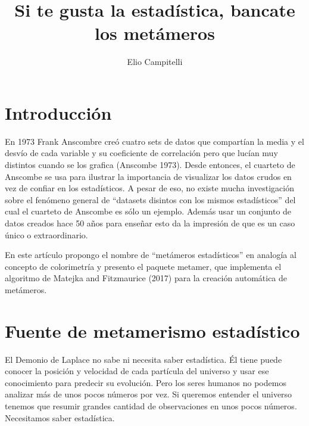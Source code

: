 \documentclass[runningheads,español]{llncs}
\begin{document}
%
\title{Si te gusta la estadística, bancate los metámeros}
%
%
\author{
Elio Campitelli }



%
\maketitle
%

 



\hypertarget{introduccion}{%
\section{Introducción}\label{introduccion}}

En 1973 Frank Anscombre creó cuatro sets de datos que compartían la
media y el desvío de cada variable y su coeficiente de correlación pero
que lucían muy distintos cuando se los grafica (Anscombe 1973). Desde
entonces, el cuarteto de Anscombe se usa para ilustrar la importancia de
visualizar los datos crudos en vez de confiar en los estadísticos. A
pesar de eso, no existe mucha investigación sobre el fenómeno general de
``datasets disintos con los mismos estadísticos'' del cual el cuarteto
de Anscombe es sólo un ejemplo. Además usar un conjunto de datos creados
hace 50 años para enseñar esto da la impresión de que es un caso único o
extraordinario.

En este artículo propongo el nombre de ``metámeros estadísticos'' en
analogía al concepto de colorimetría y presento el paquete metamer, que
implementa el algoritmo de Matejka and Fitzmaurice (2017) para la
creación automática de metámeros.

\hypertarget{fuente-de-metamerismo-estadistico}{%
\section{Fuente de metamerismo
estadístico}\label{fuente-de-metamerismo-estadistico}}

El Demonio de Laplace no sabe ni necesita saber estadística. Él tiene
puede conocer la posición y velocidad de cada partícula del universo y
usar ese conocimiento para predecir su evolución. Pero los seres humanos
no podemos analizar más de unos pocos números por vez. Si queremos
entender el universo tenemos que resumir grandes cantidad de
observaciones en unos pocos números. Necesitamos saber estadística.
\end{document}
